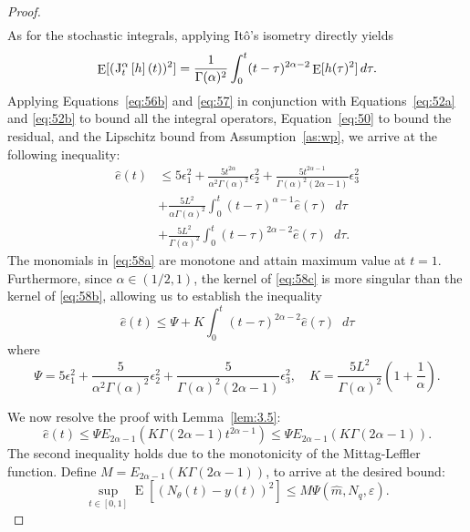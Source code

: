 \documentclass[11pt, a4paper]{article}
\theoremstyle{theoremstyle}
\theoremstyle{definitionstyle}
\newcommand{\dd}{\mathop{}\!d}
\DeclareMathOperator{\EE}{\mathrm E}
\begin{document}
\begin{proof}
\begin{subequations}
\begin{align}
        \end{align}
    \end{subequations}
    As for the stochastic integrals, applying It\^o's isometry directly yields
    \begin{equation}\label{eq:57}
        \EE [(\JJ\left [h \right ](t))^2] = \frac 1{\Gamma(\alpha)^2} \int_0^t (t - \tau)^{2\alpha-2} \EE[h(\tau)^2]\dd{\tau}.
    \end{equation}
    Applying Equations~\ref{eq:56b} and \ref{eq:57} in conjunction with Equations~\ref{eq:52a} and \ref{eq:52b} to bound all the integral operators, Equation~\ref{eq:50} to bound the residual, and the Lipschitz bound from Assumption~\ref{as:wp}, we arrive at the following inequality:
    \begin{subequations}
    \begin{align}
        \hat e(t) &\leq 5\epsilon_1^2 + \frac{5t^{2\alpha}}{\alpha^2\Gamma(\alpha)^2} \epsilon_2^2 + \frac{5t^{2\alpha-1}}{\Gamma(\alpha)^2(2\alpha-1)}\epsilon_3^2 \label{eq:58a} \\
        &+ \frac{5L^2}{\alpha\Gamma(\alpha)^2}\int_0^t (t - \tau)^{\alpha-1}\hat e(\tau)\dd{\tau} \label{eq:58b} \\
        &+ \frac{5L^2}{\Gamma(\alpha)^2}\int_0^t (t - \tau)^{2\alpha-2}\hat e(\tau)\dd{\tau}. \label{eq:58c}
    \end{align}
    \end{subequations}
    The monomials in \ref{eq:58a} are monotone and attain maximum value at \( t = 1 \). Furthermore, since \(\alpha \in (1/2, 1)\), the kernel of \ref{eq:58c} is more singular than the kernel of \ref{eq:58b}, allowing us to establish the inequality
    \begin{equation}
        \hat e(t) \leq \Psi + K\int_0^t (t - \tau)^{2\alpha-2}\hat e(\tau)\dd{\tau}
    \end{equation}
    where
    \begin{equation}
        \Psi = 5\epsilon_1^2 + \frac 5{\alpha^2\Gamma(\alpha)^2}\epsilon_2^2 + \frac 5{\Gamma(\alpha)^2(2\alpha-1)}\epsilon_3^2, \quad K = \frac{5L^2}{\Gamma(\alpha)^2} \left ( 1 + \frac 1\alpha \right ).
    \end{equation}

    We now resolve the proof with Lemma~\ref{lem:3.5}:
    \begin{equation}
        \hat e(t) \leq \Psi E_{2\alpha-1}(K\Gamma(2\alpha-1)t^{2\alpha-1}) \leq \Psi E_{2\alpha-1}(K\Gamma(2\alpha-1)).
    \end{equation}
    The second inequality holds due to the monotonicity of the Mittag-Leffler function. Define \(M = E_{2\alpha-1}(K\Gamma(2\alpha-1))\), to arrive at the desired bound:
    \begin{equation}
        \sup_{t \in [0,1]} \EE \left [ (N_\theta(t) - y(t))^2 \right ] \leq M\Psi(\hat m, N_q, \varepsilon).
    \end{equation}
\end{proof}
\end{document}
